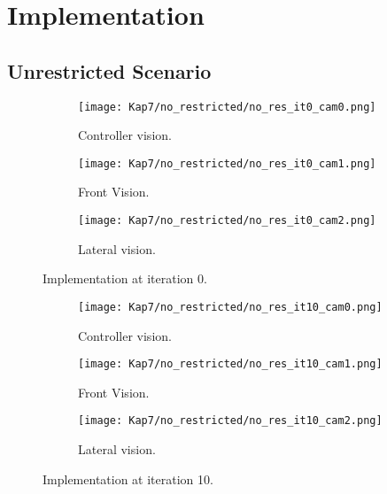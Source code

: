 \chapter{Implementation}


\section{Unrestricted Scenario}
\begin{figure}
\centering
\begin{subfigure}[t]{\textwidth}
    \texttt{[image: Kap7/no\_restricted/no\_res\_it0\_cam0.png]}
    \caption{Controller vision.}
    \label{fig:first}
\end{subfigure}
\vspace{1cm}
\begin{subfigure}[b]{0.4\textwidth}
    \texttt{[image: Kap7/no\_restricted/no\_res\_it0\_cam1.png]}
    \caption{Front Vision.}
    \label{fig:second}
\end{subfigure}
\hfill
\begin{subfigure}[b]{0.50\textwidth}
    \texttt{[image: Kap7/no\_restricted/no\_res\_it0\_cam2.png]}
    \caption{Lateral vision.}
    \label{fig:third}
\end{subfigure}
\caption{Implementation at iteration 0.}
\label{fig:figures}
\end{figure}





\begin{figure}
\centering
\begin{subfigure}[t]{\textwidth}
    \texttt{[image: Kap7/no\_restricted/no\_res\_it10\_cam0.png]}
    \caption{Controller vision.}
    \label{fig:first}
\end{subfigure}
\vspace{1cm}
\begin{subfigure}[b]{0.4\textwidth}
    \texttt{[image: Kap7/no\_restricted/no\_res\_it10\_cam1.png]}
    \caption{Front Vision.}
    \label{fig:second}
\end{subfigure}
\hfill
\begin{subfigure}[b]{0.50\textwidth}
    \texttt{[image: Kap7/no\_restricted/no\_res\_it10\_cam2.png]}
    \caption{Lateral vision.}
    \label{fig:third}
\end{subfigure}
\caption{Implementation at iteration 10.}
\label{fig:figures}
\end{figure}




